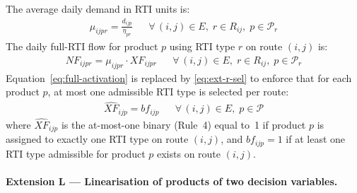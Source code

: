 {The average daily demand in RTI units is:}
%
\begin{align}
  \mu_{ijpr} = \frac{d_{ijp}}{\eta_{pr}}
  && {\forall\,(i,j)\in E,\;r\in R_{ij},\;p\in\mathcal{P}_r}
  \label{eq:ext-p-mu}
\end{align}
%
{The daily full-RTI flow for product $p$ using RTI type $r$
on route $(i,j)$ is:}
%
\begin{align}
  NF_{ijpr} = \mu_{ijpr} \cdot XF_{ijpr}
  && {\forall\,(i,j)\in E,\;r\in R_{ij},\;p\in\mathcal{P}_r}
  \label{eq:ext-p-NF}
\end{align}
%
{Equation~\eqref{eq:full-activation} is replaced by
\eqref{eq:ext-r-sel} to enforce that for each product $p$, at most one
admissible RTI type is selected per route:}
%
\begin{align}
  \widehat{XF}_{ijp} = bf_{ijp}
  && {\forall\,(i,j)\in E,\;p\in\mathcal{P}}
  \label{eq:ext-r-sel}
\end{align}
%
{where $\widehat{XF}_{ijp}$ is the at-most-one binary
(Rule~4) equal to~1 if product $p$ is assigned to exactly one RTI type on
route $(i,j)$, and $bf_{ijp}=1$ if at least one RTI type admissible for
product $p$ exists on route $(i,j)$.}

\paragraph{Extension L --- Linearisation of products of two decision variables.}
